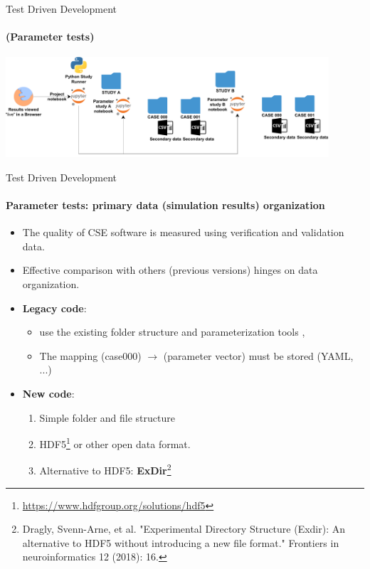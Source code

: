 \documentclass[
	aspectratio=169,%
	color={accentcolor=2d},
	logo=true,%
	colorframetitle=true,%
	]{tudabeamer}
\begin{document}
\begin{frame}{Test Driven Development} 
    \framesubtitle{(Parameter tests)}
    
    \vfill
    \begin{center}
            \includegraphics[width=0.9\textwidth]{figures/Cluster-Parameter-Study-Organization.pdf}
    \end{center}
\end{frame}

\begin{frame}{Test Driven Development} 
    \framesubtitle{Parameter tests: primary data (simulation results) organization}

    \begin{itemize}
        \item The quality of CSE software is measured using verification and validation data. 
        \item Effective comparison with others (previous versions) hinges on data organization.
    \end{itemize}
    
    \vfill
    \begin{itemize}
        \item \textbf{Legacy code}: 
            \begin{itemize}
                \item use the existing folder structure and parameterization tools \faGraduationCap,
                \item The mapping (case000) $\to$ (parameter vector) must be stored (YAML, ...)
            \end{itemize}
        \item \textbf{New code}: 
            \begin{enumerate}
                \item Simple folder and file structure \faGraduationCap
                \item HDF5\footnote{\url{https://www.hdfgroup.org/solutions/hdf5}} or other open data format.
                \item Alternative to HDF5: \textbf{ExDir}\footnote{Dragly, Svenn-Arne, et al. "Experimental Directory Structure (Exdir): An alternative to HDF5 without introducing a new file format." Frontiers in neuroinformatics 12 (2018): 16.} 
            \end{enumerate}
    \end{itemize}

\end{frame}
\end{document}
